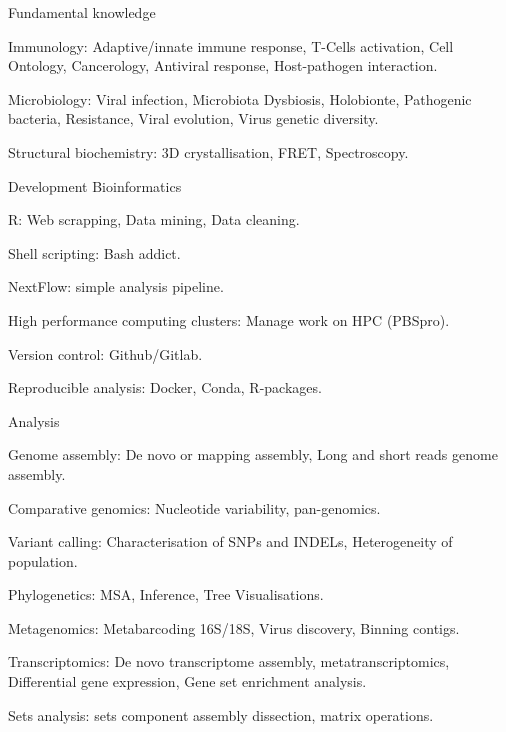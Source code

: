 \begin{cventries}
  \cventry
    {Fundamental knowledge} %
    {} %
    {} %
    {} %
    {
      \begin{cvitems} %
        \item {Immunology: Adaptive/innate immune response, T-Cells activation, Cell Ontology, Cancerology, Antiviral response, Host-pathogen interaction.}
        \item {Microbiology: Viral infection, Microbiota Dysbiosis, Holobionte, Pathogenic bacteria, Resistance, Viral evolution, Virus genetic diversity.}
        \item {Structural biochemistry: 3D crystallisation, FRET, Spectroscopy.}
      \end{cvitems}
    }

  \cventry
    {Development} %
    {Bioinformatics} %
    {} %
    {} %
    {
      \begin{cvitems} %
        \item {R: Web scrapping, Data mining, Data cleaning.}
        \item {Shell scripting: Bash addict.}
        \item {NextFlow: simple analysis pipeline.}
        \item {High performance computing clusters: Manage work on HPC (PBSpro).}
        \item {Version control: Github/Gitlab.}
        \item {Reproducible analysis: Docker, Conda, R-packages.}
      \end{cvitems}
    }

  \cventry
    {Analysis} %
    {} %
    {} %
    {} %
    {
      \begin{cvitems} %
        \item {Genome assembly: De novo or mapping assembly, Long and short reads genome assembly.}
        \item {Comparative genomics: Nucleotide variability, pan-genomics.}
        \item {Variant calling: Characterisation of SNPs and INDELs, Heterogeneity of population.}
        \item {Phylogenetics: MSA, Inference, Tree Visualisations.}
        \item {Metagenomics: Metabarcoding 16S/18S, Virus discovery, Binning contigs.}
        \item {Transcriptomics: De novo transcriptome assembly, metatranscriptomics, Differential gene expression, Gene set enrichment analysis.}
        \item {Sets analysis: sets component assembly dissection, matrix operations.}
      \end{cvitems}
    }


\end{cventries}